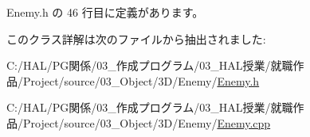  Enemy.\+h の 46 行目に定義があります。



このクラス詳解は次のファイルから抽出されました\+:\begin{DoxyCompactItemize}
\item 
C\+:/\+H\+A\+L/\+P\+G関係/03\+\_\+作成プログラム/03\+\_\+\+H\+A\+L授業/就職作品/\+Project/source/03\+\_\+\+Object/3\+D/\+Enemy/\mbox{\hyperlink{_enemy_8h}{Enemy.\+h}}\item 
C\+:/\+H\+A\+L/\+P\+G関係/03\+\_\+作成プログラム/03\+\_\+\+H\+A\+L授業/就職作品/\+Project/source/03\+\_\+\+Object/3\+D/\+Enemy/\mbox{\hyperlink{_enemy_8cpp}{Enemy.\+cpp}}\end{DoxyCompactItemize}
